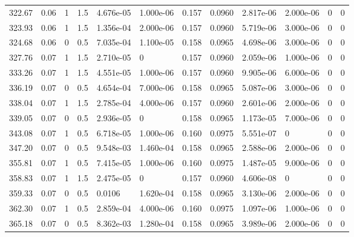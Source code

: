 \documentclass[preview]{standalone}
\begin{document}
{{{\begin{tabular}{L{1.2cm}C{1.2cm} C{0.3cm}C{0.5cm} C{1.4cm}C{1.4cm} C{1.4cm}C{1.4cm} C{1.6cm}C{1.6cm} C{1.6cm}C{1.6cm}}
  322.67  &  0.06  & 1     & 1.5 &  4.676e-05  & 1.000e-06  &  0.157&   0.0960& 2.817e-06 & 2.000e-06   &  0 & 0  \\ 
  323.93  &  0.06  & 1     & 1.5 &  1.356e-04  & 2.000e-06  &  0.157&   0.0960& 5.719e-06 & 3.000e-06   &  0 & 0  \\ 
  324.68  &  0.06  & 0     & 0.5 &  7.035e-04  & 1.100e-05  &  0.158&   0.0965& 4.698e-06 & 3.000e-06   &  0 & 0  \\ 
  327.76  &  0.07  & 1     & 1.5 &  2.710e-05  & 0  &  0.157&   0.0960& 2.059e-06 & 1.000e-06   &  0 & 0  \\ 
  333.26  &  0.07  & 1     & 1.5 &  4.551e-05  & 1.000e-06  &  0.157&   0.0960& 9.905e-06 & 6.000e-06   &  0 & 0  \\ 
  336.19  &  0.07  & 0     & 0.5 &  4.654e-04  & 7.000e-06  &  0.158&   0.0965& 5.087e-06 & 3.000e-06   &  0 & 0  \\ 
  338.04  &  0.07  & 1     & 1.5 &  2.785e-04  & 4.000e-06  &  0.157&   0.0960& 2.601e-06 & 2.000e-06   &  0 & 0  \\ 
  339.05  &  0.07  & 0     & 0.5 &  2.936e-05  & 0  &  0.158&   0.0965& 1.173e-05 & 7.000e-06   &  0 & 0  \\ 
  343.08  &  0.07  & 1     & 0.5 &  6.718e-05  & 1.000e-06  &  0.160&   0.0975& 5.551e-07 & 0   &  0 & 0  \\ 
  347.20  &  0.07  & 0     & 0.5 &  9.548e-03  & 1.460e-04  &  0.158&   0.0965& 2.588e-06 & 2.000e-06   &  0 & 0  \\ 
  355.81  &  0.07  & 1     & 0.5 &  7.415e-05  & 1.000e-06  &  0.160&   0.0975& 1.487e-05 & 9.000e-06   &  0 & 0  \\ 
  358.83  &  0.07  & 1     & 1.5 &  2.475e-05  & 0  &  0.157&   0.0960& 4.606e-08 & 0   &  0 & 0  \\ 
  359.33  &  0.07  & 0     & 0.5 &  0.0106  & 1.620e-04  &  0.158&   0.0965& 3.130e-06 & 2.000e-06   &  0 & 0  \\ 
  362.30  &  0.07  & 1     & 0.5 &  2.859e-04  & 4.000e-06  &  0.160&   0.0975& 1.097e-06 & 1.000e-06   &  0 & 0  \\ 
  365.18  &  0.07  & 0     & 0.5 &  8.362e-03  & 1.280e-04  &  0.158&   0.0965& 3.989e-06 & 2.000e-06   &  0 & 0  \\ 
\hline 
\end{tabular} 

}}}
\end{document}

